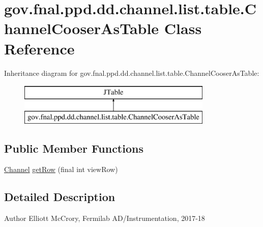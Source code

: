 \hypertarget{classgov_1_1fnal_1_1ppd_1_1dd_1_1channel_1_1list_1_1table_1_1ChannelCooserAsTable}{\section{gov.\-fnal.\-ppd.\-dd.\-channel.\-list.\-table.\-Channel\-Cooser\-As\-Table Class Reference}
\label{classgov_1_1fnal_1_1ppd_1_1dd_1_1channel_1_1list_1_1table_1_1ChannelCooserAsTable}
}
Inheritance diagram for gov.\-fnal.\-ppd.\-dd.\-channel.\-list.\-table.\-Channel\-Cooser\-As\-Table\-:\begin{figure}[H]
\begin{center}
\leavevmode
\includegraphics[height=2.000000cm]{classgov_1_1fnal_1_1ppd_1_1dd_1_1channel_1_1list_1_1table_1_1ChannelCooserAsTable}
\end{center}
\end{figure}
\subsection*{Public Member Functions}
\begin{DoxyCompactItemize}
\item 
\hyperlink{interfacegov_1_1fnal_1_1ppd_1_1dd_1_1signage_1_1Channel}{Channel} \hyperlink{classgov_1_1fnal_1_1ppd_1_1dd_1_1channel_1_1list_1_1table_1_1ChannelCooserAsTable_acb5af42a57b27a5bffd85fd6e3a3dbcf}{get\-Row} (final int view\-Row)
\end{DoxyCompactItemize}


\subsection{Detailed Description}
\begin{DoxyAuthor}{Author}
Elliott Mc\-Crory, Fermilab A\-D/\-Instrumentation, 2017-\/18 
\end{DoxyAuthor}


